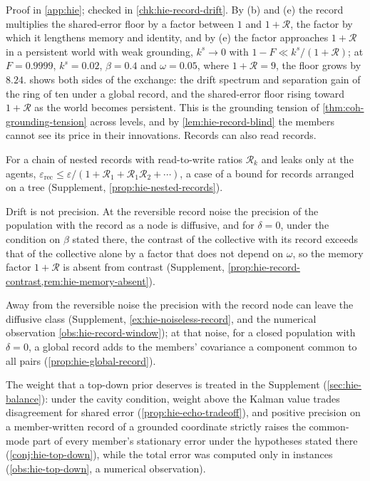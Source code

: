 Proof in \cref{app:hie}; checked in \cref{chk:hie-record-drift}. By (b) and (e) the record multiplies the shared-error floor by a factor between $1$ and $1+\mathcal R$, the factor by which it lengthens memory and identity, and by (e) the factor approaches $1+\mathcal R$ in a persistent world with weak grounding, $k^s\to0$ with $1-F\ll k^s/(1+\mathcal R)$; at $F=0.9999$, $k^s=0.02$, $\beta=0.4$ and $\omega=0.05$, where $1+\mathcal R=9$, the floor grows by $8.24$.  shows both sides of the exchange: the drift spectrum and separation gain of the ring of ten under a global record, and the shared-error floor rising toward $1+\mathcal R$ as the world becomes persistent. This is the grounding tension of \cref{thm:coh-grounding-tension} across levels, and by \cref{lem:hie-record-blind} the members cannot see its price in their innovations. Records can also read records.

For a chain of nested records with read-to-write ratios $\mathcal R_k$ and leaks only at the agents, $\varepsilon_{\mathrm{rec}}\le\varepsilon/(1+\mathcal R_1+\mathcal R_1\mathcal R_2+\cdots)$, a case of a bound for records arranged on a tree (Supplement, \cref{prop:hie-nested-records}).

Drift is not precision. At the reversible record noise the precision of the population with the record as a node is diffusive, and for $\delta=0$, under the condition on $\beta$ stated there, the contrast of the collective with its record exceeds that of the collective alone by a factor that does not depend on $\omega$, so the memory factor $1+\mathcal R$ is absent from contrast (Supplement, \cref{prop:hie-record-contrast,rem:hie-memory-absent}).

Away from the reversible noise the precision with the record node can leave the diffusive class (Supplement, \cref{ex:hie-noiseless-record}, and the numerical observation \cref{obs:hie-record-window}); at that noise, for a closed population with $\delta=0$, a global record adds to the members' covariance a component common to all pairs (\cref{prop:hie-global-record}).

The weight that a top-down prior deserves is treated in the Supplement (\cref{sec:hie-balance}): under the cavity condition, weight above the Kalman value trades disagreement for shared error (\cref{prop:hie-echo-tradeoff}), and positive precision on a member-written record of a grounded coordinate strictly raises the common-mode part of every member's stationary error under the hypotheses stated there (\cref{conj:hie-top-down}), while the total error was computed only in instances (\cref{obs:hie-top-down}, a numerical observation).

